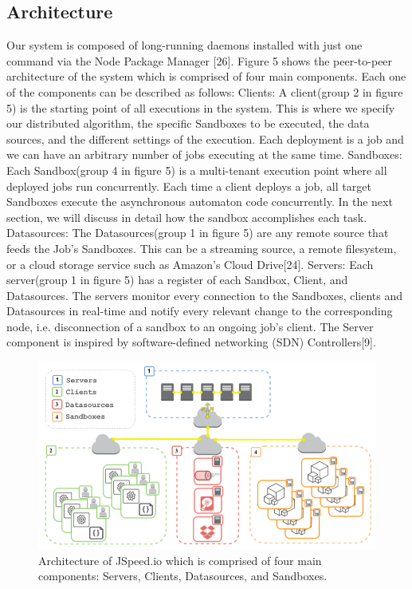 \documentclass[10pt,reprint]{socc14}
\begin{document}
\subsection{Architecture}
Our system is composed of long-running daemons installed with just one command via the Node Package Manager [26]. Figure 5 shows the peer-to-peer architecture of the system which is comprised of four main components. Each one of the components can be described as follows:
Clients: A client(group 2 in figure 5)  is the starting point of all executions in the system. This is where we specify our distributed algorithm, the specific Sandboxes to be executed, the data sources, and the different settings of the execution. Each deployment is a job and we can have an arbitrary number of jobs executing at the same time.
Sandboxes: Each Sandbox(group 4 in figure 5) is a multi-tenant execution point where all deployed jobs run concurrently. Each time a client deploys a job, all target Sandboxes execute the asynchronous automaton code concurrently. In the next section, we will discuss in detail how the sandbox accomplishes each task.
Datasources: The Datasources(group 1 in figure 5) are any remote source that feeds the Job’s Sandboxes. This can be a streaming source, a remote filesystem, or a cloud storage service such as Amazon’s Cloud Drive[24].
Servers: Each server(group 1 in figure 5)  has a register of each Sandbox, Client, and Datasources. The servers monitor every connection to the Sandboxes, clients and Datasources in real-time and notify every relevant change to the corresponding node, i.e. disconnection of a sandbox to an ongoing job’s client. The Server component is inspired by software-defined networking (SDN) Controllers[9].




\begin{figure}
	\centering
	\includegraphics[scale=0.6]{architectureDiagram}
	\caption{Architecture of JSpeed.io which is comprised of four main components: Servers, Clients, Datasources, and Sandboxes.}
\end{figure}
\end{document}
